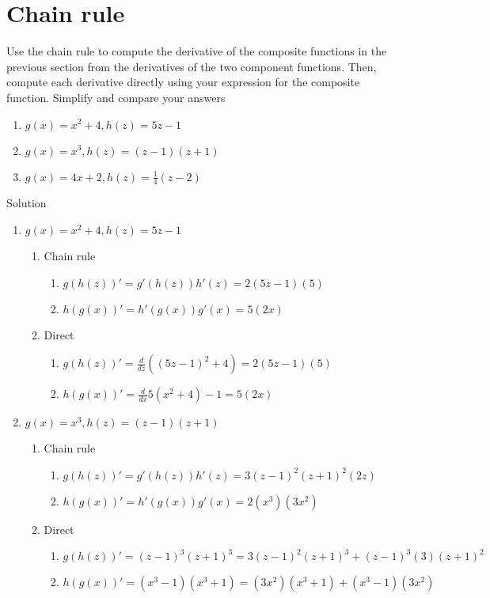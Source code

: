 \documentclass[12pt]{article}
\begin{document}
\section{Chain rule}
Use the chain rule to compute the derivative of the composite functions in the previous section
from the derivatives of the two component functions. Then, compute each derivative directly
using your expression for the composite function. Simplify and compare your answers
\begin{enumerate}
    \item $g(x) = x^2 +4, h(z) = 5z-1$
    \item $g(x) = x^3, h(z) = (z-1)(z+1)$ 
    \item $g(x) = 4x+2, h(z) = \frac{1}{4}(z-2)$
\end{enumerate}
Solution
\begin{enumerate}
    \item $g(x) = x^2 +4, h(z) = 5z-1$
     \begin{enumerate}
         \item Chain rule
         \begin{enumerate}
            \item $g(h(z))' = g'(h(z))h'(z) = 2(5z-1)(5)$
            \item $h(g(x))' = h'(g(x))g'(x) = 5(2x)$
        \end{enumerate}
         \item Direct
         \begin{enumerate}
            \item $g(h(z))' = \frac{d}{dz}( (5z-1)^2 +4) = 2(5z-1)(5)$
            \item $h(g(x))' = \frac{d}{dx} 5(x^2+4)-1 = 5(2x)$
        \end{enumerate}
     \end{enumerate}
     
    \item $g(x) = x^3, h(z) = (z-1)(z+1)$ 
     \begin{enumerate}
         \item Chain rule
         \begin{enumerate}
            \item $g(h(z))' = g'(h(z))h'(z) = 3(z-1)^2(z+1)^2(2z)$
            \item $h(g(x))' = h'(g(x))g'(x) = 2(x^3)(3x^2)$
        \end{enumerate}
         \item Direct
         \begin{enumerate}
            \item $g(h(z))' = (z-1)^3(z+1)^3 =3(z-1)^2(z+1)^3 +(z-1)^3(3)(z+1)^2$
            \item $h(g(x))' = (x^3-1)(x^3+1) = (3x^2)(x^3+1)+(x^3-1)(3x^2)$
        \end{enumerate}
     \end{enumerate}
     

\end{enumerate}
\end{document}
